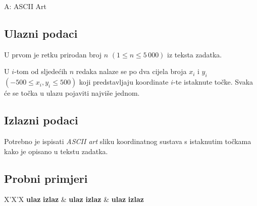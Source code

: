 \begin{statement}[
  timelimit=1 s,
  memorylimit=512 MiB,
]{A: ASCII Art}
\subsection*{Ulazni podaci}
U prvom je retku prirodan broj $n$ $(1 \le n \le 5\,000)$ iz teksta
zadatka.

U $i$-tom od sljedećih $n$ redaka nalaze se po dva cijela broja $x_i$ i
$y_i$ $(-500 \le x_i, y_i \le 500)$ koji predstavljaju koordinate $i$-te
istaknute točke. Svaka će se točka u ulazu pojaviti najviše jednom.

\subsection*{Izlazni podaci}
Potrebno je ispisati \textit{ASCII art} sliku koordinatnog sustava s
istaknutim točkama kako je opisano u tekstu zadatka.

\subsection*{Probni primjeri}
\begin{tabularx}{\textwidth}{X'X'X}
  \textbf{ulaz}
  \linespread{1}{}
  \textbf{izlaz}
  \linespread{1}{} &
  \textbf{ulaz}
  \linespread{1}{}
  \textbf{izlaz}
  \linespread{1}{} &
  \textbf{ulaz}
  \linespread{1}{}
  \textbf{izlaz}
  \linespread{1}{}
\end{tabularx}

\end{statement}


